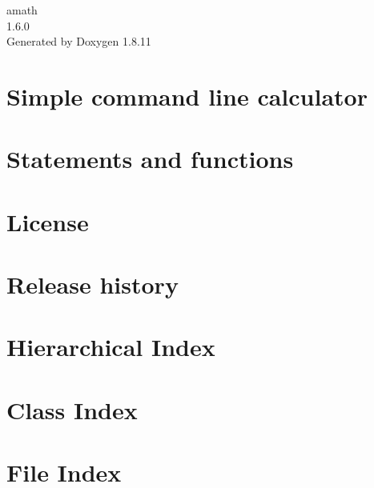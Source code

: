 \documentclass[twoside]{book}
\newcommand{\+}{\discretionary{\mbox{\scriptsize$\hookleftarrow$}}{}{}}
\newcommand{\clearemptydoublepage}{%
  \newpage{\pagestyle{empty}\cleardoublepage}%
}
\begin{document}
\hypersetup{pageanchor=false,
             bookmarksnumbered=true,
             pdfencoding=unicode
            }
\begin{titlepage}
\vspace*{7cm}
\begin{center}%
{\Large amath \\[1ex]\large 1.\+6.\+0 }\\
\vspace*{1cm}
{\large Generated by Doxygen 1.8.11}\\
\end{center}
\end{titlepage}
\clearemptydoublepage
\tableofcontents
\clearemptydoublepage
{}
\hypersetup{pageanchor=true}

\chapter{Simple command line calculator}
\label{index}\hypertarget{index}{}
\chapter{Statements and functions}
\label{command_page}
\hypertarget{command_page}{}

\chapter{License}
\label{license_page}
\hypertarget{license_page}{}

\chapter{Release history}
\label{release_page}
\hypertarget{release_page}{}

\chapter{Hierarchical Index}

\chapter{Class Index}

\chapter{File Index}

\end{document}
